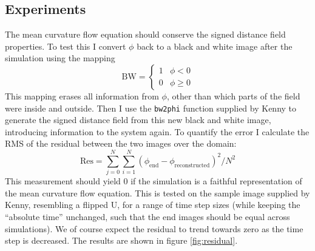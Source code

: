 \documentclass[sigconf]{acmart}
\begin{document}
\subsection{Experiments}
The mean curvature flow equation should conserve the signed distance field properties. To test this I convert $ \phi $ back to a black and white image after the simulation using the mapping
\begin{equation}\label{key}
	\text{BW} = \begin{cases}
	1 & \phi < 0 \\
	0 & \phi \geq 0
	\end{cases}
\end{equation}
This mapping erases all information from $ \phi $, other than which parts of the field were inside and outside. Then I use the \texttt{bw2phi} function supplied by Kenny to generate the signed distance field from this new black and white image, introducing information to the system again. To quantify the error I calculate the RMS of the residual between the two images over the domain:
\begin{equation}\label{key}
	\text{Res} = \sum_{j=0}^N \sum_{i=1}^{N} (\phi_{\text{end}} - \phi_{\text{reconstructed}})^2 / N^2
\end{equation} 
This measurement should yield 0 if the simulation is a faithful representation of the mean curvature flow equation. This is tested on the sample image supplied by Kenny, resembling a flipped U, for a range of time step sizes (while keeping the ``absolute time'' unchanged, such that the end images should be equal across simulations). We of course expect the residual to trend towards zero as the time step is decreased. The results are shown in figure \ref{fig:residual}.
\end{document}
